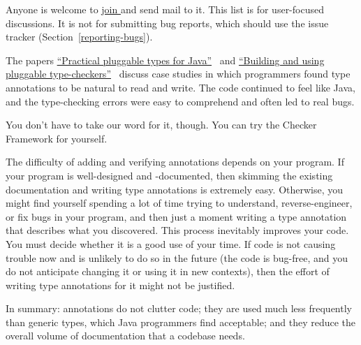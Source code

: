 Anyone is welcome to
\href{https://groups.google.com/forum/#!forum/checker-framework-discuss}{join
  } and send mail to it.
This list is for user-focused discussions.  It is not for submitting bug reports,
which should use the issue tracker (Section~\ref{reporting-bugs}).





The papers
\href{https://homes.cs.washington.edu/~mernst/pubs/pluggable-checkers-issta2008-abstract.html}{``Practical
  pluggable types for Java''}~\cite{PapiACPE2008}
and
\href{https://homes.cs.washington.edu/~mernst/pubs/pluggable-checkers-icse2011-abstract.html}{``Building
  and using pluggable type-checkers''}~\cite{DietlDEMS2011}
discuss case studies in
which programmers
found type annotations to be natural to read and write.  The code
continued to feel like Java, and the type-checking errors were easy to
comprehend and often led to real bugs.

You don't have to take our word for it, though.  You can try the
Checker Framework for yourself.

The difficulty of adding and verifying annotations depends on your program.
If your program is well-designed and -documented, then skimming the
existing documentation and writing type annotations is extremely easy.
Otherwise, you might find yourself spending a lot of time trying to
understand, reverse-engineer, or fix bugs in your program, and then just a
moment writing a type annotation that describes what you discovered.  This
process inevitably improves your code.  You must decide whether it is a
good use of your time.  If code is not causing trouble now and is
unlikely to do so in the future (the code is bug-free, and you do not
anticipate changing it or using it in new contexts), then the
effort of writing type annotations for it might not be justified.




In summary:  annotations do not clutter code; they are used much
less frequently than generic types, which Java programmers find acceptable;
and they reduce the overall volume of documentation that a codebase needs.

